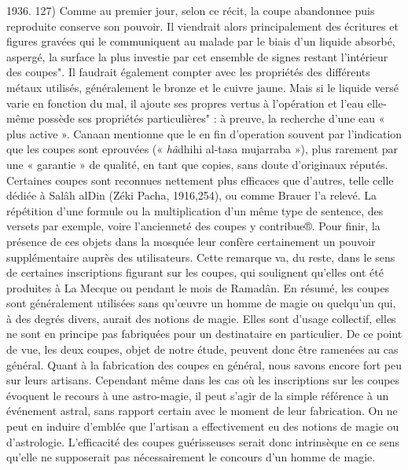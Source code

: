 1936. 127)
 Comme au premier jour, selon ce récit, la coupe abandonnee puis reproduite conserve son pouvoir.
Il viendrait alors principalement des écritures et figures gravées qui le communiquent au malade par le biais d'un liquide absorbé, aspergé, la surface la plus investie par cet ensemble de signes restant l'intérieur des coupes". Il faudrait également compter avec les propriétés des différents métaux utilisés, généralement le bronze et le cuivre jaune. Mais si le liquide versé varie en fonction du mal, il ajoute ses propres vertus à l'opération et l'eau elle-même possède ses propriétés particulières" : à preuve, la recherche d'une eau « plus active ». Canaan mentionne que le en fin d'operation
souvent par l'indication que les coupes sont eprouvées (« \textit{hâ}dhihi al-tasa mujarraba »), plus rarement par une « garantie » de qualité, en tant que copies, sans doute d'originaux réputés. Certaines coupes sont reconnues nettement plus efficaces que d'autres, telle celle dédiée à Salâh alDin (Zéki Pacha, 1916,254), ou comme Brauer l'a relevé. La répétition d'une formule ou la multiplication d'un même type de sentence, des versets par exemple, voire l'ancienneté des coupes y contribue®. Pour finir, la présence de ces objets dans la mosquée leur confère certainement un pouvoir supplémentaire auprès des utilisateurs. Cette remarque va, du reste, dans le sens de certaines inscriptions figurant sur les coupes, qui soulignent qu'elles ont été produites à La Mecque ou pendant le mois de Ramadân.
En résumé, les coupes sont généralement utilisées sans qu'œuvre un homme de magie ou quelqu'un qui, à des degrés divers, aurait des notions de magie. Elles sont d'usage collectif, elles ne sont en principe pas fabriquées pour un destinataire en particulier. De ce point de vue, les deux coupes, objet de notre étude, peuvent donc être ramenées au cas général.
Quant à la fabrication des coupes en général, nous savons encore fort peu sur leurs artisans. Cependant même dans les cas où les inscriptions sur les coupes évoquent le recours à une astro-magie, il peut s'agir de la simple référence à un événement astral, sans rapport certain avec le moment de leur fabrication. On ne peut en induire d'emblée que l'artisan a effectivement eu des notions de magie ou d'astrologie. L'efficacité des coupes guérisseuses serait donc intrinsèque en ce sens qu'elle ne supposerait pas nécessairement le concours d'un homme de magie.
